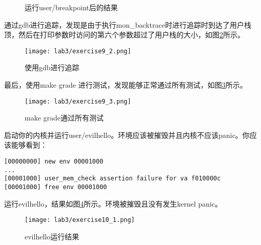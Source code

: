 \begin{exerciseSolution}{9}
\begin{figure}[htb]
        \caption{运行user/breakpoint后的结果}
        \label{fig:lab3/exercise9_1}
    \end{figure}
    \par 通过gdb进行追踪，发现是由于执行mon\_backtrace时进行追踪时到达了用户栈顶，然后在打印参数时访问的第六个参数超过了用户栈的大小，如图\ref{fig:lab3/exercise9_2}所示。
    \begin{figure}[htb]
        \centering
        \texttt{[image: lab3/exercise9\_2.png]}
        \caption{使用gdb进行追踪}
        \label{fig:lab3/exercise9_2}
    \end{figure}
    \par 最后，使用make grade 进行测试，发现能够正常通过所有测试，如图\ref{fig:lab3/exercise9_3}所示。
    \begin{figure}[htb]
        \centering
        \texttt{[image: lab3/exercise9\_3.png]}
        \caption{make grade通过所有测试}
        \label{fig:lab3/exercise9_3}
    \end{figure}
    \FloatBarrier
\end{exerciseSolution}

\begin{exerciseEnv}{10}
    \par 启动你的内核并运行user/evilhello。环境应该被摧毁并且内核不应该panic。你应该能够看到：
    \begin{lstlisting}[numbers=none]
[00000000] new env 00001000
...
[00001000] user_mem_check assertion failure for va f010000c
[00001000] free env 00001000
    \end{lstlisting}
\end{exerciseEnv}
\begin{exerciseSolution}{10}
    \par 运行evilhello，结果如图\ref{fig:lab3/exercise10_1}所示。环境被摧毁且没有发生kernel panic。
    \begin{figure}[htb]
        \centering
        \texttt{[image: lab3/exercise10\_1.png]}
        \caption{evilhello运行结果}
        \label{fig:lab3/exercise10_1}
    \end{figure}
    \FloatBarrier
\end{exerciseSolution}


